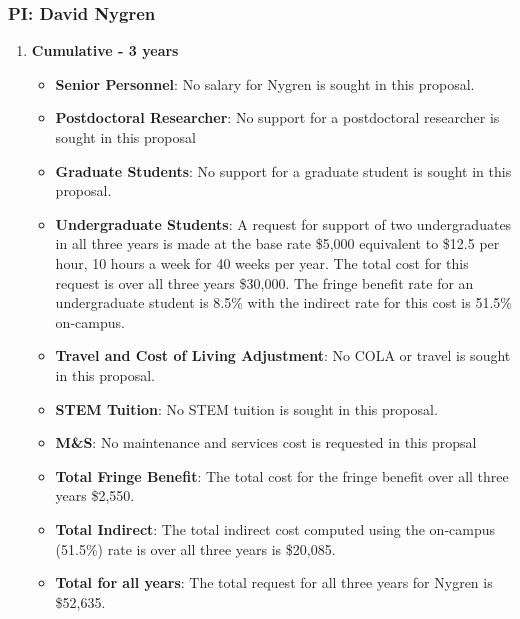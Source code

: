\subsubsection{\bf PI: David Nygren}
\begin{enumerate}

\item[]{\textbf{Cumulative - 3 years}}

\begin{itemize}[noitemsep,nolistsep]
\item{{\bf Senior Personnel}: No salary for Nygren is sought in this proposal.}

\item {{\bf Postdoctoral Researcher}: No support for a postdoctoral researcher is sought in this proposal } 

\item{{\bf Graduate Students}: No support for a graduate student is sought in this proposal. }

\item {{\bf Undergraduate Students}: A request for support of two undergraduates in all three years is made at the base rate \$5,000 equivalent to \$12.5 per hour, 10 hours a week for 40 weeks per year.  The total cost for this request is over all three years \$30,000.  The fringe benefit rate for an undergraduate student is 8.5\% with the indirect rate for this cost is 51.5\% on-campus.}

\item{{\bf Travel and Cost of Living Adjustment}: No COLA or travel is sought in this proposal.}

\item {{\bf STEM Tuition}: No STEM tuition is sought in this proposal.}

\item {{\bf M\&S}: No maintenance and services cost is requested in this propsal }

\item {{\bf Total Fringe Benefit}: The total cost for the fringe benefit over all three years \$2,550.}

\item {{\bf Total Indirect}: The total indirect cost computed using the on-campus (51.5\%) rate is over all three years is \$20,085.}

\item {{\bf Total for all years}: The total request for all three years for Nygren is \$52,635.}

\end{itemize}




\end{enumerate}
